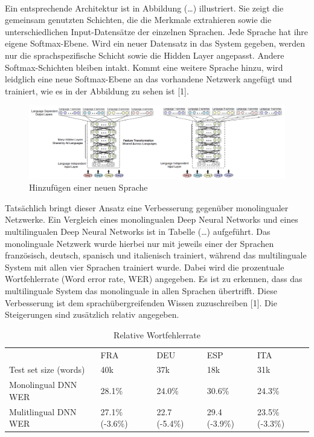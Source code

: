 \\ 
Ein entsprechende Architektur ist in Abbildung (…) illustriert. Sie zeigt die gemeinsam genutzten Schichten, die die Merkmale extrahieren sowie die unterschiedlichen Input-Datensätze der einzelnen Sprachen. Jede Sprache hat ihre eigene Softmax-Ebene. Wird ein neuer Datensatz in das System gegeben, werden nur die sprachspezifische Schicht sowie die Hidden Layer angepasst. Andere Softmax-Schichten bleiben intakt. Kommt eine weitere Sprache hinzu, wird leidglich eine neue Softmax-Ebene an das vorhandene Netzwerk angefügt und trainiert, wie es in der Abbildung zu sehen ist [1]. 

\begin{figure}[h!]
	\centering
	\includegraphics[width=1.0\linewidth]{images/shared_hidden_layer}
	\caption{Hinzufügen einer neuen Sprache  \cite{GonzalezDominguez.2015}} %
	\label{fig:topology}
\end{figure}

Tatsächlich bringt dieser Ansatz eine Verbesserung gegenüber monolingualer Netzwerke. Ein Vergleich eines monolingualen Deep Neural Networks und eines multilingualen Deep Neural Networks ist in Tabelle (…) aufgeführt. Das monolinguale Netzwerk wurde hierbei nur mit jeweils einer der Sprachen französisch, deutsch, spanisch und italienisch trainiert, während das multilinguale System mit allen vier Sprachen trainiert wurde. Dabei wird die prozentuale Wortfehlerrate (Word error rate, WER) angegeben. Es ist zu erkennen, dass das multilinguale System das monolinguale in allen Sprachen übertrifft. Diese Verbesserung ist dem sprachübergreifenden Wissen zuzuschreiben [1]. Die Steigerungen sind zusätzlich relativ angegeben. 

\begin{table}[h!]
	\begin{tabular}{lllll}
		& FRA             & DEU           & ESP           & ITA             \\
		Test set size (words) & 40k             & 37k           & 18k           & 31k             \\
		Monolingual DNN WER   & 28.1\%          & 24.0\%        & 30.6\%        & 24.3\%          \\
		Mulitlingual DNN WER  & 27.1\% (-3.6\%) & 22.7 (-5.4\%) & 29.4 (-3.9\%) & 23.5\% (-3.3\%)
	\end{tabular}
	\centering
	\caption{Relative Wortfehlerrate}
	\label{my-label}
\end{table}

